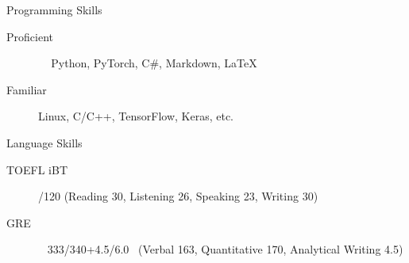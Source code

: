 \documentclass{resume} %
\begin{document}
\begin{rSection}{Programming Skills}

\begin{description}
    \item[Proficient] \quad\quad\quad\quad\,\,\,\,\, Python, PyTorch, C\#, Markdown, \LaTeX
    \item[Familiar] \quad\quad\quad\quad\quad\quad Linux, C/C++, TensorFlow, Keras, etc.
    \newline
\end{description}

\end{rSection}

\begin{rSection}{Language Skills}

\begin{description}
    \item[TOEFL iBT] /120 \quad (Reading 30, Listening 26, Speaking 23, Writing 30)
    \item[GRE] \quad\quad\quad\quad\,\,\, 333/340+4.5/6.0 \, (Verbal 163, Quantitative 170, Analytical Writing 4.5)
\end{description}

\end{rSection}
\end{document}
